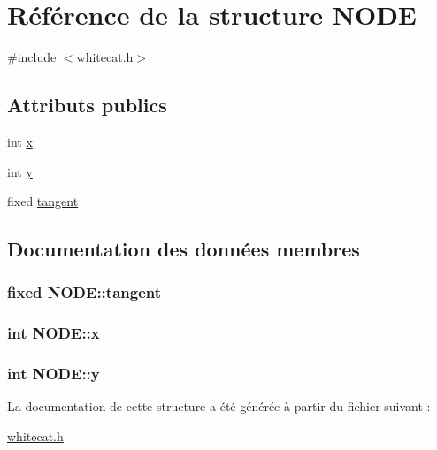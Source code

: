 \hypertarget{struct_n_o_d_e}{\section{Référence de la structure N\-O\-D\-E}
\label{struct_n_o_d_e}
}


{\ttfamily \#include $<$whitecat.\-h$>$}

\subsection*{Attributs publics}
\begin{DoxyCompactItemize}
\item 
int \hyperlink{struct_n_o_d_e_ae491648fdefa758c04fd1b39997dfe44}{x}
\item 
int \hyperlink{struct_n_o_d_e_a1c83ccf922c1655a4f4cc90fb7455670}{y}
\item 
fixed \hyperlink{struct_n_o_d_e_ab9675cd84cb7ccf6e2506c7ee233fa2c}{tangent}
\end{DoxyCompactItemize}


\subsection{Documentation des données membres}
\hypertarget{struct_n_o_d_e_ab9675cd84cb7ccf6e2506c7ee233fa2c}{
\subsubsection[{tangent}]{\setlength{\rightskip}{0pt plus 5cm}fixed N\-O\-D\-E\-::tangent}}\label{struct_n_o_d_e_ab9675cd84cb7ccf6e2506c7ee233fa2c}
\hypertarget{struct_n_o_d_e_ae491648fdefa758c04fd1b39997dfe44}{
\subsubsection[{x}]{\setlength{\rightskip}{0pt plus 5cm}int N\-O\-D\-E\-::x}}\label{struct_n_o_d_e_ae491648fdefa758c04fd1b39997dfe44}
\hypertarget{struct_n_o_d_e_a1c83ccf922c1655a4f4cc90fb7455670}{
\subsubsection[{y}]{\setlength{\rightskip}{0pt plus 5cm}int N\-O\-D\-E\-::y}}\label{struct_n_o_d_e_a1c83ccf922c1655a4f4cc90fb7455670}


La documentation de cette structure a été générée à partir du fichier suivant \-:\begin{DoxyCompactItemize}
\item 
\hyperlink{whitecat_8h}{whitecat.\-h}\end{DoxyCompactItemize}
